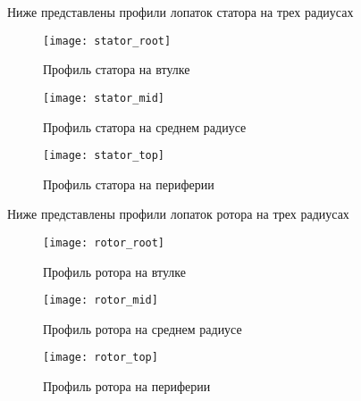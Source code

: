 Ниже представлены профили лопаток статора на трех радиусах
    \begin{figure}
        \centering
        \texttt{[image: stator\_root]}
        \caption{Профиль статора на втулке}
    \end{figure}

    \begin{figure}
        \centering
        \texttt{[image: stator\_mid]}
        \caption{Профиль статора на среднем радиусе}
    \end{figure}

    \begin{figure}
        \centering
        \texttt{[image: stator\_top]}
        \caption{Профиль статора на периферии}
    \end{figure}

Ниже представлены профили лопаток ротора на трех радиусах
    \begin{figure}
        \centering
        \texttt{[image: rotor\_root]}
        \caption{Профиль ротора на втулке}
    \end{figure}

    \begin{figure}
        \centering
        \texttt{[image: rotor\_mid]}
        \caption{Профиль ротора на среднем радиусе}
    \end{figure}

    \begin{figure}
        \centering
        \texttt{[image: rotor\_top]}
        \caption{Профиль ротора на периферии}
    \end{figure}
